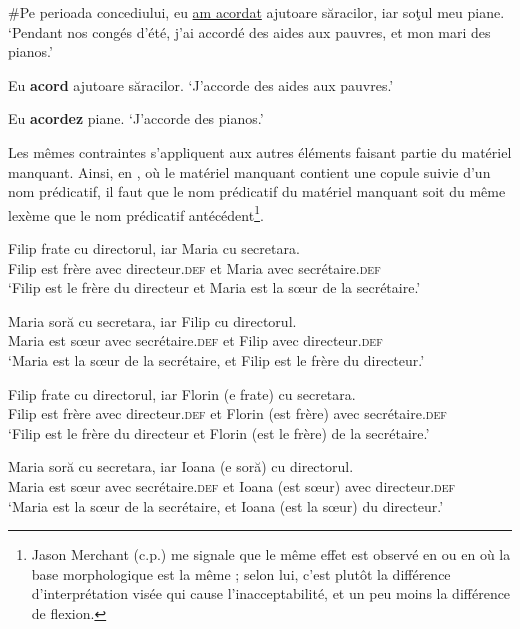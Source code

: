 \ea
\ea \#Pe perioada concediului, eu \uline{am acordat} ajutoare săracilor, iar soţul meu piane. \label{ch2:ex94a}
\glt ‘Pendant nos congés d’été, j’ai accordé des aides aux pauvres, et mon mari des pianos.’ 

\ex Eu \textbf{acord} ajutoare săracilor. \label{ch2:ex94b}
\glt ‘J’accorde des aides aux pauvres.’ 

\ex Eu \textbf{acordez} piane. \label{ch2:ex94c}
\glt ‘J’accorde des pianos.’
\z
\z

Les mêmes contraintes s’appliquent aux autres éléments faisant partie du matériel manquant. Ainsi, en , où le matériel manquant contient une copule suivie d’un nom prédicatif, il faut que le nom prédicatif du matériel manquant soit du même lexème que le nom prédicatif antécédent\footnote{
 Jason Merchant (c.p.) me signale que le même effet est observé en  ou en  où la base morphologique est la même ; selon lui, c’est plutôt la différence d’interprétation visée qui cause l’inacceptabilité, et un peu moins la différence de flexion.}.

\ea \label{ch2:ex95}
\ea 
\gll *Filip    frate  cu  directorul,  iar  Maria  cu  secretara.\\
Filip  est  frère  avec  directeur.\textsc{def}  et  Maria  avec  secrétaire.\textsc{def}\\
\glt ‘Filip est le frère du directeur et Maria est la sœur de la secrétaire.’

\ex 
\gll *Maria    soră  cu  secretara,  iar  Filip  cu  directorul.\\
Maria  est  sœur  avec  secrétaire.\textsc{def}  et  Filip  avec  directeur.\textsc{def}\\
\glt ‘Maria est la sœur de la secrétaire, et Filip est le frère du directeur.’ 

\ex 
\gll Filip    frate  cu  directorul,  iar  Florin  (e  frate)  cu  secretara.\\
Filip  est  frère  avec  directeur.\textsc{def}  et  Florin  (est  frère)  avec  secrétaire.\textsc{def}\\
\glt ‘Filip est le frère du directeur et Florin (est le frère) de la secrétaire.’

\ex 
\gll Maria    soră  cu  secretara,  iar  Ioana  (e  soră)  cu  directorul.\\
Maria  est  sœur  avec  secrétaire\textsc{.def}  et  Ioana  (est  sœur)  avec  directeur.\textsc{def}\\
\glt ‘Maria est la sœur de la secrétaire, et Ioana (est la sœur) du directeur.’ 
\z
\z

